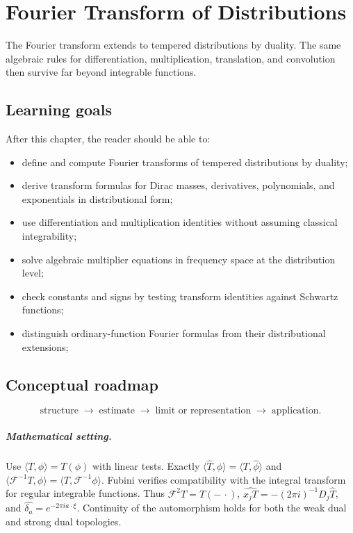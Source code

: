 \chapter{Fourier Transform of Distributions}
\label{ch:iii19}

The Fourier transform extends to tempered distributions by duality. The same algebraic rules for differentiation, multiplication, translation, and convolution then survive far beyond integrable functions.

\section*{Learning goals}
After this chapter, the reader should be able to:
\begin{itemize}
\item define and compute Fourier transforms of tempered distributions by duality;
\item derive transform formulas for Dirac masses, derivatives, polynomials, and exponentials in distributional form;
\item use differentiation and multiplication identities without assuming classical integrability;
\item solve algebraic multiplier equations in frequency space at the distribution level;
\item check constants and signs by testing transform identities against Schwartz functions;
\item distinguish ordinary-function Fourier formulas from their distributional extensions;
\end{itemize}
\section*{Conceptual roadmap}
\[
\boxed{\text{structure}\;\longrightarrow\;\text{estimate}\;\longrightarrow\;\text{limit or representation}\;\longrightarrow\;\text{application}.}
\]

\paragraph{Mathematical setting.}
Use $\langle T,\phi\rangle=T(\phi)$ with linear tests. Exactly $\langle\widehat T,\phi\rangle=\langle T,\widehat\phi\rangle$ and $\langle\mathcal F^{-1}T,\phi\rangle=\langle T,\mathcal F^{-1}\phi\rangle$. Fubini verifies compatibility with the integral transform for regular integrable functions. Thus $\mathcal F^2T=T(-\,\cdot)$, $\widehat{x_jT}=-(2\pi i)^{-1}D_j\widehat T$, and $\widehat{\delta_a}=e^{-2\pi ia\cdot\xi}$. Continuity of the automorphism holds for both the weak dual and strong dual topologies.

